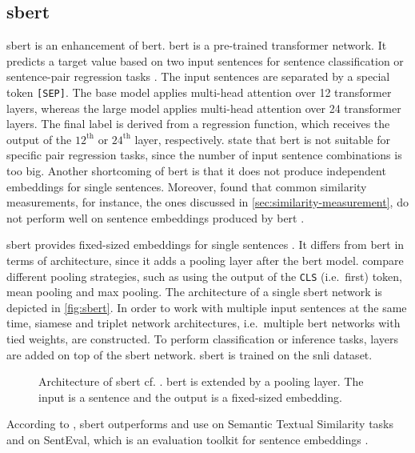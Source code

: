 \subsection{\acl*{sbert}}\label{subsec:hf-sent-ransformers}

\ac{sbert} is an enhancement of \ac{bert}.
\ac{bert} is a pre-trained transformer network.
It predicts a target value based on two input sentences for sentence classification or sentence-pair regression tasks \cite{HfsentTrans2019}.
The input sentences are separated by a special token \texttt{[SEP]}.
The base model applies multi-head attention over 12 transformer layers, whereas the large model applies multi-head attention over 24 transformer layers.
The final label is derived from a regression function, which receives the output of the $12^\text{th}$ or $24^\text{th}$ layer, respectively.
\citeauthor{HfsentTrans2019} state that \ac{bert} is not suitable for specific pair regression tasks, 
since the number of input sentence combinations is too big.
Another shortcoming of \ac{bert} is that it does not produce independent embeddings for single sentences.
Moreover, \citeauthor{HfsentTrans2019} found that common similarity measurements, for instance, the ones discussed in \autoref{sec:similarity-measurement}, 
do not perform well on sentence embeddings produced by \ac{bert} \cite{HfsentTrans2019}.

\ac{sbert} provides fixed-sized embeddings for single sentences \cite{HfsentTrans2019}.
It differs from \ac{bert} in terms of architecture, since it adds a pooling layer after the \ac{bert} model.
\citeauthor{HfsentTrans2019} compare different pooling strategies, such as using the output of the \texttt{CLS} (i.e.\ first) token, mean pooling and max pooling.
The architecture of a single \ac{sbert} network is depicted in \autoref{fig:sbert}.
In order to work with multiple input sentences at the same time, siamese and triplet network architectures, 
i.e.\ multiple \ac{bert} networks with tied weights, are constructed.
To perform classification or inference tasks, layers are added on top of the \ac{sbert} network.
\ac{sbert} is trained on the \ac{snli} dataset.

\begin{figure}[!htb] %
    \centering
    
    \caption[Architecture of \ac{sbert}]{Architecture of \ac{sbert} cf. \cite{HfsentTrans2019}.
    \ac{bert} is extended by a pooling layer.
    The input is a sentence and the output is a fixed-sized embedding.
    }
    \label{fig:sbert}
\end{figure}

According to \citeauthor{HfsentTrans2019}, \ac{sbert} outperforms \infersent{} and \ac{use} on Semantic Textual Similarity tasks 
and on SentEval, which is an evaluation toolkit for sentence embeddings \cite{HfsentTrans2019}.
